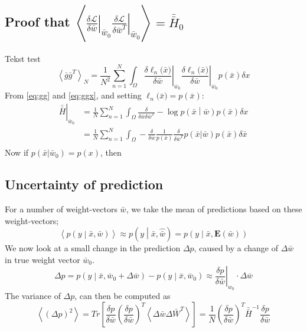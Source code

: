\subsection{Proof that $\left\langle \left. \frac{\delta \mathcal{L}}{\delta \bar{w}} \right|_{\bar{w}_0} \left. \frac{\delta \mathcal{L}}{\delta \bar{w}^T} \right|_{\bar{w}_0}  \right\rangle = \bar{\bar{H}}_0$ }
Tekst test
\begin{equation}
\left\langle \bar{g} \bar{g}^T \right\rangle_N = 
\frac{1}{N^2} \sum_{n = 1}^N \int_{\Omega} 
\left. \frac{\delta \ell_n({\bar{x})}}{\delta \bar{w}} \right|_{\bar{w}_0}
\left. \frac{\delta \ell_n({\bar{x})}}{\delta \bar{w}} \right|_{\bar{w}_0}
p(\bar{x}) \delta x \label{eq:ggx}
\end{equation}
From \eqref{eq:gg} and \eqref{eq:ggx}, and setting $ \ell_n({\bar{x})} = p(\bar{x})$:
\begin{align}
\left.\bar{\bar{H}} \right|_{\bar{w}_0} &= 
\frac{1}{N} \sum_{n = 1}^N \int_{\Omega} 
\frac{\delta}{\delta \bar{w} \delta \bar{w}^T}
- \log p\left(\bar{x} \middle| \bar{w} \right) p(\bar{x}) \delta x\\
 &= \frac{1}{N} \sum_{n = 1}^N \int_{\Omega} - \frac{\delta}{\delta \bar{w}} \frac{1}{p\left(\bar{x}\right)}\frac{\delta }{\delta \bar{w}^T} p(\bar{x} | \bar{w}) p(\bar{x}) \delta \bar{x}\\
\end{align}
Now if $p(\bar{x}|\bar{w}_0) = p(x)$, then



\subsection{Uncertainty of prediction}
For a number of weight-vectors $\bar{w}$, we take the mean of predictions based on these weight-vectors;
\begin{equation}
\left\langle p \left(y \middle| \bar{x}, \bar{w} \right) \right\rangle \approx p \left(y \middle| \bar{x}, \hat{\bar{w}} \right) = p \left(y \middle| \bar{x}, \mathbf{E}(\bar{w}) \right)
\end{equation}
We now look at a small change in the prediction $\Delta p$, caused by a change of $\Delta \bar{w}$ in true weight vector $\bar{w}_0$. 
\begin{equation}
\Delta p = p \left(y \middle| \bar{x}, \bar{w}_0+\Delta \bar{w} \right)
- p \left(y \middle| \bar{x}, \bar{w}_0 \right) 
\approx \left.\frac{\delta p}{\delta \bar{w}} \right|_{w_0}\cdot \Delta \bar{w}
\end{equation}
The variance of $\Delta p$, can then be computed as
\begin{equation}
\left\langle (\Delta p)^2 \right\rangle = Tr\left[ 
\frac{\delta p}{\delta \bar{w}} \left(\frac{\delta p}{\delta \bar{w}}\right)^T
\left\langle \Delta \bar{w} \Delta \bar{W}^T \right\rangle \right]
= \frac{1}{N} \left(\frac{\delta p}{\delta \bar{w}}\right)^T 
 \bar{\bar{H}}^{-1} \frac{\delta p}{\delta \bar{w}}
\end{equation}

